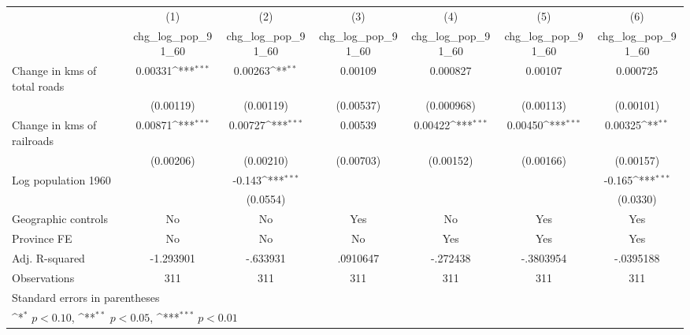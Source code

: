 {
\def\sym#1{\ifmmode^{#1}\else\(^{#1}\)\fi}
\begin{tabular}{l*{6}{c}}
\hline\hline
                    &\multicolumn{1}{c}{(1)}&\multicolumn{1}{c}{(2)}&\multicolumn{1}{c}{(3)}&\multicolumn{1}{c}{(4)}&\multicolumn{1}{c}{(5)}&\multicolumn{1}{c}{(6)}\\
                    &\multicolumn{1}{c}{chg\_log\_pop\_91\_60}&\multicolumn{1}{c}{chg\_log\_pop\_91\_60}&\multicolumn{1}{c}{chg\_log\_pop\_91\_60}&\multicolumn{1}{c}{chg\_log\_pop\_91\_60}&\multicolumn{1}{c}{chg\_log\_pop\_91\_60}&\multicolumn{1}{c}{chg\_log\_pop\_91\_60}\\
\hline
Change in kms of total roads&     0.00331\sym{***}&     0.00263\sym{**} &     0.00109         &    0.000827         &     0.00107         &    0.000725         \\
                    &   (0.00119)         &   (0.00119)         &   (0.00537)         &  (0.000968)         &   (0.00113)         &   (0.00101)         \\
[1em]
Change in kms of railroads&     0.00871\sym{***}&     0.00727\sym{***}&     0.00539         &     0.00422\sym{***}&     0.00450\sym{***}&     0.00325\sym{**} \\
                    &   (0.00206)         &   (0.00210)         &   (0.00703)         &   (0.00152)         &   (0.00166)         &   (0.00157)         \\
[1em]
Log population 1960 &                     &      -0.143\sym{***}&                     &                     &                     &      -0.165\sym{***}\\
                    &                     &    (0.0554)         &                     &                     &                     &    (0.0330)         \\
\hline
Geographic controls &          No         &          No         &         Yes         &          No         &         Yes         &         Yes         \\
Province FE         &          No         &          No         &          No         &         Yes         &         Yes         &         Yes         \\
Adj. R-squared      &   -1.293901         &    -.633931         &    .0910647         &    -.272438         &   -.3803954         &   -.0395188         \\
Observations        &         311         &         311         &         311         &         311         &         311         &         311         \\
\hline\hline
\multicolumn{7}{l}{\footnotesize Standard errors in parentheses}\\
\multicolumn{7}{l}{\footnotesize \sym{*} \(p<0.10\), \sym{**} \(p<0.05\), \sym{***} \(p<0.01\)}\\
\end{tabular}
}

